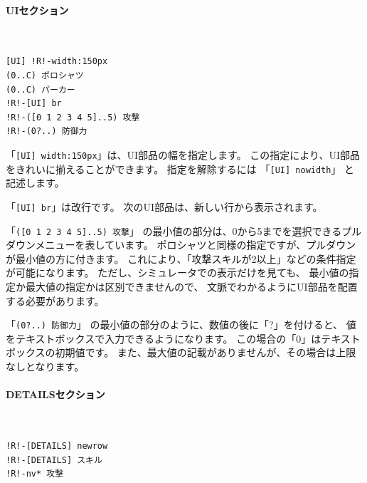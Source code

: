 \documentclass[dvipdfmx]{jsarticle}
\begin{document}
\paragraph{UIセクション}~\medskip
{\footnotesize\begin{mdframed}\begin{Verbatim}[commandchars=!<>]
[UI] !R!-width:150px
(0..C) ポロシャツ
(0..C) パーカー
!R!-[UI] br
!R!-([0 1 2 3 4 5]..5) 攻撃
!R!-(0?..) 防御力
\end{Verbatim}
\end{mdframed}}
\medskip

「\texttt{[UI] width:150px}」は、UI部品の幅を指定します。
この指定により、UI部品をきれいに揃えることができます。
指定を解除するには 「\texttt{[UI] nowidth}」 と記述します。

「\texttt{[UI] br}」は改行です。
次のUI部品は、新しい行から表示されます。

「\texttt{([0 1 2 3 4 5]..5) 攻撃}」
の最小値の部分は、0から5までを選択できるプルダウンメニューを表しています。
ポロシャツと同様の指定ですが、プルダウンが最小値の方に付きます。
これにより、「攻撃スキルが2以上」などの条件指定が可能になります。
ただし、シミュレータでの表示だけを見ても、
最小値の指定か最大値の指定かは区別できませんので、
文脈でわかるようにUI部品を配置する必要があります。

「\texttt{(0?..) 防御力}」
の最小値の部分のように、数値の後に「?」を付けると、
値をテキストボックスで入力できるようになります。
この場合の「0」はテキストボックスの初期値です。
また、最大値の記載がありませんが、その場合は上限なしとなります。

\begin{center}
\end{center}

\paragraph{DETAILSセクション}~\medskip
{\footnotesize\begin{mdframed}\begin{Verbatim}[commandchars=!<>]
!R!-[DETAILS] newrow
!R!-[DETAILS] スキル
!R!-nv* 攻撃
\end{Verbatim}
\end{mdframed}}
\medskip
\end{document}
